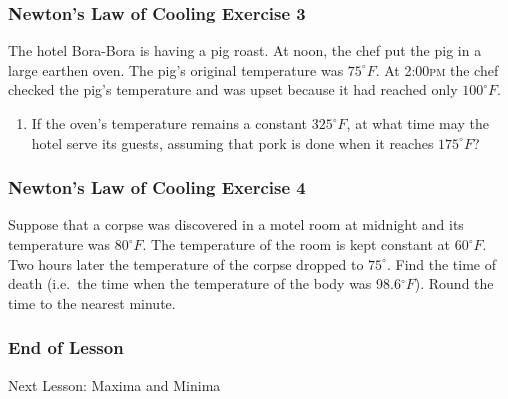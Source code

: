 \documentclass[xcolor=dvipsnames]{beamer}
\begin{document}
\begin{frame}
  \frametitle{Newton's Law of Cooling Exercise 3}
The hotel Bora-Bora is having a pig roast. At noon, the chef put the
pig in a large earthen oven. The pig's original temperature was
$75^{\circ}F$. At 2:00\textsc{pm} the chef checked the pig's
temperature and was upset because it had reached only $100^{\circ}F$.
\begin{enumerate}
\item If the oven's temperature remains a constant $325^{\circ}F$, at
  what time may the hotel serve its guests, assuming that pork is done
  when it reaches $175^{\circ}F$?
\end{enumerate}
\end{frame}

\begin{frame}
  \frametitle{Newton's Law of Cooling Exercise 4}
  Suppose that a corpse was discovered in a motel room at midnight and
  its temperature was $80^{\circ}F$. The temperature of the room is
  kept constant at $60^{\circ}F$. Two hours later the temperature of
  the corpse dropped to $75^{\circ}$. Find the time of death (i.e.\
  the time when the temperature of the body was 98.6$^{\circ}F$).
  Round the time to the nearest minute.
\end{frame}

\begin{frame}
  \frametitle{End of Lesson}
Next Lesson: Maxima and Minima
\end{frame}
\end{document}
